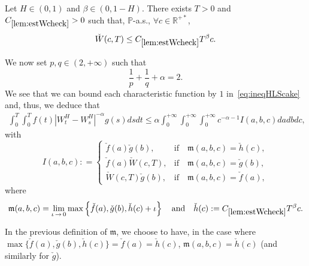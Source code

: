 \documentclass[AHL,Unicode,longabstracts,published]{cedram}
\newcommand{\bbP}{\mathbb{P}}
\newcommand{\bbR}{\mathbb{R}}
\newcommand{\frkm}{\mathfrak{m}}
\let\oldforall\forall
\renewcommand*{\forall}{\mathrel{\oldforall}}
\begin{document}
\begin{lemm}\label{lem:estWcheck}
Let $H\in(0,1)$ and $\beta\in (0,1-H)$. There exists $T>0$ and $C_{\ref{lem:estWcheck}}>0$ such that, $\bbP$-a.s., $\forall c\in\bbR^{+*}$,
\[
\check{W}(c,T) \leq C_{\ref{lem:estWcheck}} T^{\beta} c.
\]
\end{lemm}

We now set $p,q\in (2,+\infty)$ such that
\[
\frac 1 p + \frac 1 q + \alpha = 2.
\]
We see that we can bound each characteristic function by $1$ in~\eqref{eq:ineqHLScake} and, thus, we deduce that
\begin{align*}
\int_0^T\int_0^T f(t)\left|W_t^H-W_s^H\right|^{-\alpha}g(s) ds dt \leq \alpha\int_0^{+\infty}\int_0^{+\infty}\int_0^{+\infty} c^{-\alpha-1}I(a,b,c) da db dc,
\end{align*}
with
\[
I(a,b,c) : =
\begin{cases}
\check{f}(a)\check{g}(b), &\text{if}\quad \frkm(a,b,c) = \check{h}(c),
\\ \check{f}(a)\check{W}(c,T), &\text{if}\quad \frkm(a,b,c) = \check{g}(b),
\\ \check{W}(c,T)\check{g}(b), &\text{if}\quad \frkm(a,b,c) = \check{f}(a),
\end{cases}
\]
where
\[
\frkm(a,b,c) = \lim_{\iota\,\to\,0} \max\left\{ \check{f}(a),\check{g}(b),\check{h}(c)+\iota\right\}\quad\text{and}\quad\check{h}(c) : = C_{\ref{lem:estWcheck}} T^{\beta} c.
\]

\begin{rema}
In the previous definition of $\frkm$, we choose to have, in the case where $\max\{ \check{f}(a),\check{g}(b),\check{h}(c)\} = \check{f}(a) = \check{h}(c)$, $\frkm(a,b,c) = \check{h}(c)$ (and similarly for $\check{g}$).
\end{rema}
\end{document}
